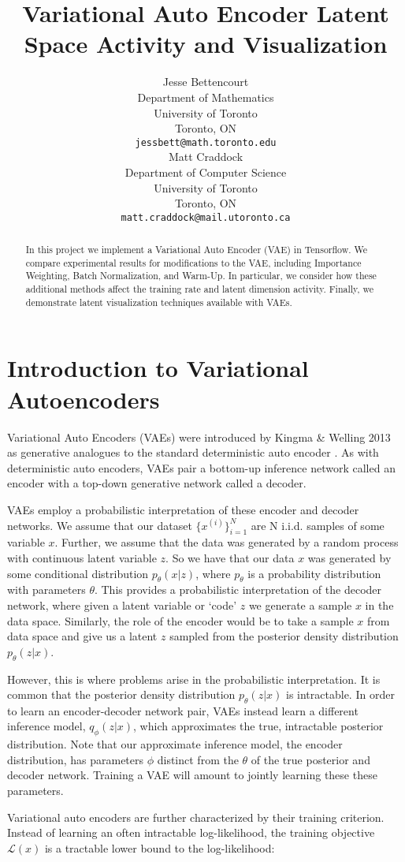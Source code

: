 \documentclass{article} %
\title{Variational Auto Encoder Latent Space Activity and Visualization}
\author{
Jesse Bettencourt\\
Department of Mathematics\\
University of Toronto\\
Toronto, ON \\
\texttt{jessbett@math.toronto.edu} \\
\And
Matt Craddock\\
Department of Computer Science\\
University of Toronto\\
Toronto, ON \\
\texttt{matt.craddock@mail.utoronto.ca} \\
}
\numberwithin{figure}{section}
\renewcommand{\L}{\mathcal{L}}
\begin{document}
\maketitle

\begin{abstract}
In this project we implement a Variational Auto Encoder (VAE) in Tensorflow. We compare experimental results for modifications to the VAE, including Importance Weighting, Batch Normalization, and Warm-Up. In particular, we consider how these additional methods affect the training rate and latent dimension activity. Finally, we demonstrate latent visualization techniques available with VAEs.
\end{abstract}

\section{Introduction to Variational Autoencoders}

Variational Auto Encoders (VAEs) were introduced by Kingma \& Welling 2013 as generative analogues to the standard deterministic auto encoder \cite{Kingma2013}. As with deterministic auto encoders, VAEs pair a bottom-up inference network called an encoder with a top-down generative network called a decoder. 
\par VAEs employ a probabilistic interpretation of these encoder and decoder networks. We assume that our dataset $\{x^{(i)}\}_{i=1}^N$ are N i.i.d. samples of some variable $x$. Further, we assume that the data was generated by a random process with continuous latent variable $z$. So we have that our data $x$ was generated by some conditional distribution $p_\theta(x|z)$, where $p_\theta$ is a probability distribution with parameters $\theta$. This provides a probabilistic interpretation of the decoder network, where given a latent variable or `code' $z$ we generate a sample $x$ in the data space. Similarly, the role of the encoder would be to take a sample $x$ from data space and give us a latent $z$ sampled from the posterior density distribution $p_\theta(z|x)$. 
\par However, this is where problems arise in the probabilistic interpretation. It is common that the posterior density distribution $p_\theta(z|x)$ is intractable. In order to learn an encoder-decoder network pair, VAEs instead learn a different inference model, $q_\phi(z|x)$, which approximates the true, intractable posterior distribution. Note that our approximate inference model, the encoder distribution, has parameters $\phi$ distinct from the $\theta$ of the true posterior and decoder network. Training a VAE will amount to jointly learning these these parameters.
\par Variational auto encoders are further characterized by their training criterion. Instead of learning an often intractable log-likelihood, the training objective $\L(x)$ is a tractable lower bound to the log-likelihood:
\end{document}
